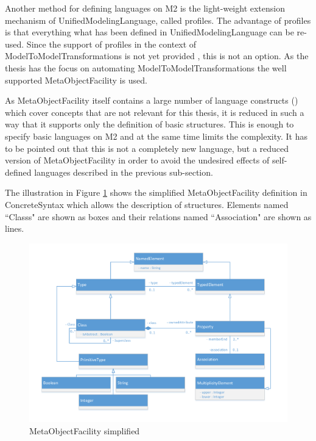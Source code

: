 Another method for defining languages on M2 is the light-weight extension mechanism of \gls{UnifiedModelingLanguage}, called profiles. The advantage of profiles is that everything what has been defined in \gls{UnifiedModelingLanguage} can be re-used. Since the support of profiles in the context of \glspl{ModelToModelTransformation} is not yet provided \cite{Randak2011}, this is not an option. As the thesis has the focus on automating \glspl{ModelToModelTransformation} the well supported \gls{MetaObjectFacility} is used.

As \gls{MetaObjectFacility} itself contains a large number of language constructs (\cite{ObjectManagementGroup2013}) which cover concepts that are not relevant for this thesis, it is reduced in such a way that it supports only the definition of basic structures. This is enough to specify basic languages on M2 and at the same time limits the complexity. It has to be pointed out that this is not a completely new language, but a reduced version of \gls{MetaObjectFacility} in order to avoid the undesired effects of self-defined languages described in the previous sub-section.

The illustration in Figure \ref{figMOFSimplified} shows the simplified \gls{MetaObjectFacility} definition in \gls{ConcreteSyntax} which allows the description of structures. Elements named ``\Glspl{Class}" are shown as boxes and their relations named ``\Gls{Association}" are shown as lines. 

\begin{figure}[!ht]
	\centering
	\includegraphics[scale=0.6, trim=0cm 1cm 0cm 1cm, clip=true]{Images/MOFSimplified.pdf} 
	\caption{\Gls{MetaObjectFacility} simplified}
	\label{figMOFSimplified}
\end{figure}

